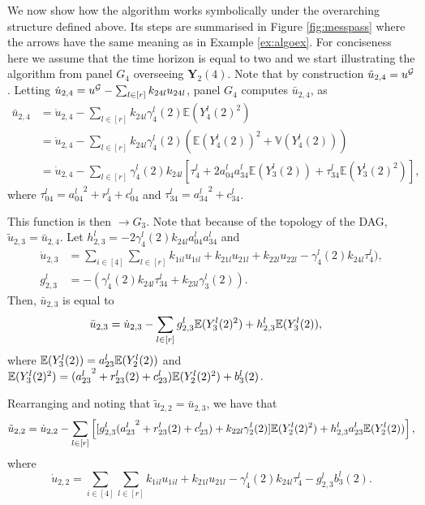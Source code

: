 We now show how the algorithm works symbolically under the overarching structure defined above. Its steps are summarised in Figure \ref{fig:messpass} where the arrows have the same meaning as in Example \ref{ex:algoex}. For conciseness here we assume that the time horizon is equal to two and we start illustrating the algorithm from panel $G_4$ overseeing $\bm{Y}_2(4)$. Note that by construction $\tilde{u}_{2,4}=u^{\mathcal{G}}$. Letting $\dot{u}_{2,4}=u^{\mathcal{G}}-\sum_{l\in[r]}k_{24l}u_{24l}$, panel $G_4$  computes $\bar{u}_{2,4}$, as
\begin{align*}
\bar{u}_{2,4}&=\dot{u}_{2,4}-\sum_{l\in[r]}k_{24l}\gamma_4^l(2)\mathbb{E}(Y_4^l(2)^2)\\
&=\dot{u}_{2,4}-\sum_{l\in[r]}k_{24l}\gamma_4^l(2)(\mathbb{E}(Y_4^l(2))^2+\mathbb{V}(Y_4^l(2)))\\
&=\dot{u}_{2,4}-\sum_{l\in[r]}\gamma_4^l(2)k_{24l}\left[\tau^l_{4}+2a^l_{04}a^l_{34}\mathbb{E}(Y_3^l(2))+\tau^l_{34}\mathbb{E}(Y_3^l(2)^2)\right],
\end{align*}
where $\tau^l_{04}={a^l_{04}}^2+r^l_{4}+c^l_{04}$ and $\tau^l_{34}={a^l_{34}}^2+c^l_{34}$.

This function is then $\longrightarrow G_3$. Note that because of the topology of the DAG, $\tilde{u}_{2,3}=\bar{u}_{2,4}$. Let  $h_{2,3}^l=-2\gamma_4^l(2)k_{24l}a_{04}^la_{34}^l$ and 
\begin{align*}
\dot{u}_{2,3}&=\sum_{i\in[4]}\sum_{l\in[r]}k_{1il}u_{1il}+k_{21l}u_{21l}+k_{22l}u_{22l}-\gamma_4^l(2)k_{24l}\tau_{4}^l),\\
g_{2,3}^l&=-(\gamma_4^l(2)k_{24l}\tau_{34}^l+k_{23l}\gamma_{3}^l(2)).
\end{align*}  
Then, $\bar{u}_{2,3}$ is equal to 
\begin{align*}
\bar{u}_{2,3}&=\dot{u}_{2,3}-\sum_{l\in[r]}g_{2,3}^l\mathbb{E}(Y_{3}^l(2)^2)+h_{2,3}^l\mathbb{E}(Y_3^l(2)),
\end{align*}
where $\mathbb{E}(Y_3^l(2))=a_{23}^l\mathbb{E}(Y_2^l(2))$ and $\mathbb{E}(Y_3^l(2)^2)=({a_{23}^l}^2+r_{23}^l(2)+c_{23}^l)\mathbb{E}(Y_2^l(2)^2)+b_3^l(2)$.

Rearranging and noting that $\tilde{u}_{2,2}=\bar{u}_{2,3}$, we have that
\begin{equation}
\label{eq:kmn}
\tilde{u}_{2,2}=\dot{u}_{2,2}-\sum_{l\in[r]}\left[[g_{2,3}^l({a_{23}^l}^2+r_{23}^l(2)+c_{23}^l)+k_{22l}\gamma_{2}^l(2)]\E(Y_2^l(2)^2)+h_{2,3}^la_{23}^l\E(Y_2^l(2))\right],
\end{equation}
where 
\begin{equation}
\label{eq:kmnp}
\dot{u}_{2,2}=\sum_{i\in[4]}\sum_{l\in[r]}k_{1il}u_{1il}+k_{21l}u_{21l}-\gamma_4^l(2)k_{24l}\tau_{4}^l-g_{2,3}^lb_3^l(2).
\end{equation}


